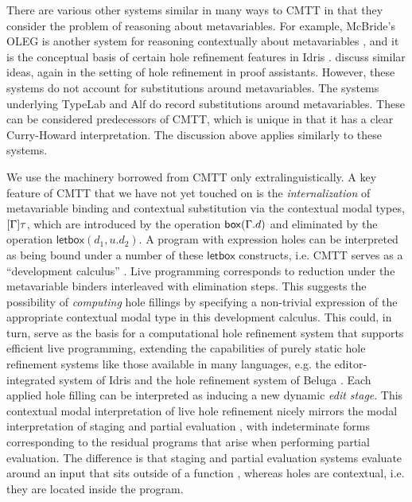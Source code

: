 There are various other systems similar in many ways to CMTT in 
that they consider the problem of reasoning about metavariables. 
For example, McBride's OLEG is another system for reasoning contextually about metavariables
\cite{DBLP:phd/ethos/McBride00}, and it is the conceptual basis of certain hole refinement features in Idris \cite{brady2013idris}. \citet{DBLP:conf/csl/GeuversJ02} discuss similar ideas, again in the setting of hole refinement in proof assistants. However, these systems do not account for substitutions around metavariables. The systems underlying TypeLab \cite{Strecker:98a} and Alf \cite{magnusson1994implementation} do record substitutions around metavariables. These can be considered predecessors of CMTT, which is unique in that it has a clear Curry-Howard interpretation. The discussion above applies similarly to these systems.


We use the machinery 
borrowed from CMTT only extralinguistically.
%
A key feature of CMTT that we have not yet touched on is the
\emph{internalization} of metavariable binding and contextual
substitution via the contextual modal types, $[\Gamma]\tau$, which
are introduced by the operation $\mathsf{box}(\Gamma.d)$ and
eliminated by the operation $\mathsf{letbox}(d_1, u.d_2)$.
%
A program with expression holes can be interpreted as being bound under a number of these $\mathsf{letbox}$ constructs, i.e. CMTT serves as a ``{development calculus}'' \cite{DBLP:phd/ethos/McBride00}. Live programming corresponds to reduction under the metavariable binders interleaved with elimination steps. 
%
This suggests the possibility of \emph{computing} hole fillings by specifying a non-trivial expression of the appropriate contextual 
modal type in this development calculus.
%
This could, in turn, serve as the basis for a computational hole
refinement system that supports efficient live programming, extending the capabilities of purely static hole
refinement systems like those available in many languages,
e.g. the editor-integrated system of Idris
\cite{brady2013idris,Korkut:2018:ETE:3240719.3241791} and the hole refinement system of Beluga
\cite{DBLP:conf/flops/Pientka10,pientka2015inductive}.
%
Each applied hole filling can be interpreted as inducing a new dynamic
\emph{edit stage}.
%
This contextual modal interpretation of live hole refinement
nicely mirrors the modal interpretation of staging and partial evaluation
\cite{Davies:2001op}, with indeterminate forms corresponding to the residual programs that arise when performing partial evaluation. 
%
The difference is that staging and partial evaluation systems evaluate around an input that sits outside of a
function \cite{Jones:1993uq}, whereas holes are contextual, i.e. they are located inside the program. 

